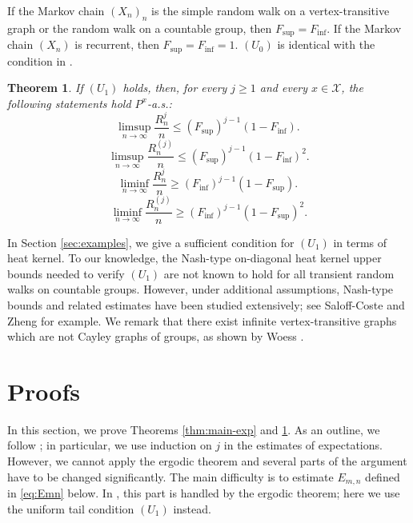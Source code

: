 \documentclass[a4paper, reqno, 11pt]{amsart}
\newtheorem{Thm}{Theorem}[section]
\theoremstyle{definition}
\begin{document}
If  the Markov chain $(X_n)_n$ is the simple random walk on a vertex-transitive graph or the random walk on a countable group, then $F_{\sup} = F_{\inf}$. 
If  the Markov chain $(X_n)$ is recurrent, then $F_{\sup} = F_{\inf} = 1$. 
$(U_0)$ is identical with the condition in \cite[Lemma 2.1]{Okamura2014}. 

\begin{Thm}\label{thm:main-SLLN}
If $(U_1)$ holds, then, for every $j \ge 1$ and every $x \in \mathcal{X}$, 
the following statements hold $P^x$-a.s.: 
\begin{equation}\label{eq:upper-SLLN-1}
\limsup_{n \to \infty} \frac{R_n^j}{n}  \le (F_{\sup})^{j-1} (1-F_{\inf}). \ 
\end{equation}
\begin{equation}\label{eq:upper-SLLN-2}
\limsup_{n \to \infty} \frac{R_n^{(j)}}{n}  \le (F_{\sup})^{j-1} (1-F_{\inf})^2. 
\end{equation} 
\begin{equation}\label{eq:lower-SLLN-1}
\liminf_{n \to \infty} \frac{R_n^j}{n}  \ge (F_{\inf})^{j-1} (1-F_{\sup}). \ 
\end{equation}
\begin{equation}\label{eq:lower-SLLN-2}
\liminf_{n \to \infty} \frac{R_n^{(j)}}{n}  \ge (F_{\inf})^{j-1} (1-F_{\sup})^2. 
\end{equation} 
\end{Thm}

In Section \ref{sec:examples}, we give a sufficient condition for $(U_1)$ in terms of heat kernel. 
To our knowledge, the Nash-type on-diagonal heat kernel upper bounds needed to verify $(U_1)$ are not known to hold for all transient random walks on countable groups.
However, under additional assumptions, Nash-type bounds and related estimates have been studied extensively; see Saloff-Coste and Zheng  \cite{SCZ2016} for example. 
We remark that there exist infinite vertex-transitive graphs which are not Cayley graphs of groups, as shown by Woess \cite{Woess2013}. 

\section{Proofs}

In this section, we prove Theorems \ref{thm:main-exp} and \ref{thm:main-SLLN}. 
As an outline, we follow \cite{Pitt1974}; in particular, we use induction on $j$ in the estimates of expectations. 
However, we cannot apply the ergodic theorem and several parts of the argument have to be changed significantly. 
The main difficulty is to estimate $E_{m,n}$ defined in \eqref{eq:Emn} below.
In \cite{Pitt1974},  this part is handled by the ergodic theorem; here we use the uniform tail condition $(U_1)$ instead. 
\end{document}
